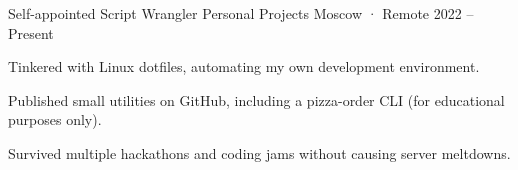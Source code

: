 
\cventry
  {Self-appointed Script Wrangler}
  {Personal Projects}
  {Moscow · Remote}
  {2022 -- Present}
  {
    \begin{cvitems}
      \item {Tinkered with Linux dotfiles, automating my own development environment.}
      \item {Published small utilities on GitHub, including a pizza-order CLI (for educational purposes only).}
      \item {Survived multiple hackathons and coding jams without causing server meltdowns.}
    \end{cvitems}
  }
